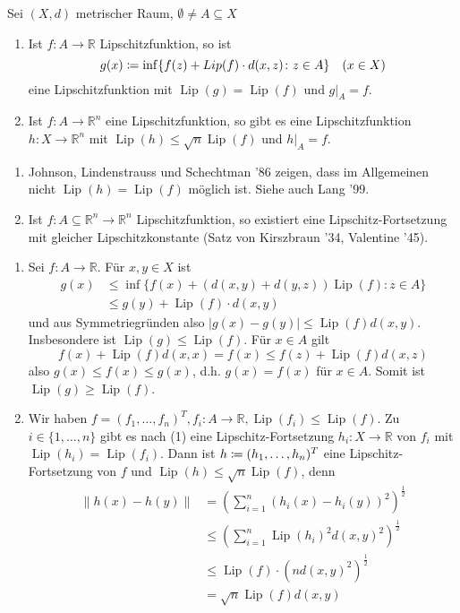 \documentclass[a4paper,twoside,DIV15,BCOR12mm]{scrbook}
\DeclareMathOperator{\Lip}{Lip}
\begin{document}
\begin{satz}
Sei \((X,d)\) metrischer Raum, \(\emptyset \neq A \subseteq X\)
\begin{enumerate}[(1)]
\item Ist \(f: A \rightarrow \mathbb R\) Lipschitzfunktion, so ist
\[
g(x) \da \inf\{f(z)+Lip(f) \cdot d(x,z) \colon z\in A\} \quad (x\in X)
\]
eine Lipschitzfunktion mit \(\Lip(g) = \Lip(f)\) und \(g|_A=f\).
\item Ist \(f: A \rightarrow \mathbb R^n\) eine Lipschitzfunktion, so gibt es eine Lipschitzfunktion \(h: X \rightarrow \mathbb R^n\) mit \(\Lip(h) \leq \sqrt n \Lip(f)\) und \(h|_A = f\).
\end{enumerate}
\end{satz}

\begin{bemerkung}
\begin{enumerate}[(1)]
\item Johnson, Lindenstrauss und Schechtman '86 zeigen, dass im Allgemeinen nicht \(\Lip(h) = \Lip(f)\) möglich ist. 
Siehe auch Lang '99.
\item Ist \(f: A \subseteq \mathbb R^n \rightarrow \mathbb R^n\) Lipschitzfunktion, so existiert eine Lipschitz-Fortsetzung mit gleicher Lipschitzkonstante (Satz von Kirszbraun '34, Valentine '45).
\end{enumerate}
\end{bemerkung}

\begin{beweis}
\begin{enumerate}[(1)]
\item Sei \(f: A\rightarrow \mathbb R\). Für \(x,y \in X\) ist
\begin{align*}
g(x) &\leq \inf\{f(x)+(d(x,y)+d(y,z))\Lip(f) \colon z \in A\} \\
&\leq g(y) + \Lip(f)\cdot d(x,y)
\end{align*}
und aus Symmetriegründen also \(|g(x)-g(y)| \leq \Lip(f) d(x,y)\). Insbesondere ist \(\Lip(g) \leq \Lip(f)\). Für \(x\in A\) gilt
\[
f(x) + \Lip(f) d(x,x) = f(x) \leq f(z)+ \Lip(f) d(x,z)
\]
also \(g(x) \leq f(x) \leq g(x)\), d.h. \(g(x) = f(x)\) für \(x\in A\). Somit ist \(\Lip(g) \geq \Lip(f)\).
\item Wir haben \(f=(f_1,\ldots,f_n)^T, f_i: A \rightarrow \mathbb R, \Lip(f_i) \leq \Lip(f)\). Zu \(i\in \{1,\ldots,n\}\) gibt es nach (1) eine Lipschitz-Fortsetzung \(h_i: X \rightarrow \mathbb R\) von \(f_i\) mit \(\Lip(h_i)=\Lip(f_i)\). Dann ist \(h\da (h_1,\ldots,h_n)^T\) eine Lipschitz-Fortsetzung von \(f\) und \(\Lip(h) \leq \sqrt n \Lip(f)\), denn
\begin{align*}
\|h(x)-h(y)\| &= \left( \sum_{i=1}^n (h_i(x)-h_i(y))^2 \right)^{\frac12} \\
&\leq \left( \sum_{i=1}^n \Lip(h_i)^2 d(x,y)^2 \right)^{\frac12} \\
&\leq \Lip(f) \cdot (n d(x,y)^2)^{\frac12} \\
&= \sqrt n \Lip(f) d(x,y)
\end{align*}
\end{enumerate}
\end{beweis}
\end{document}
